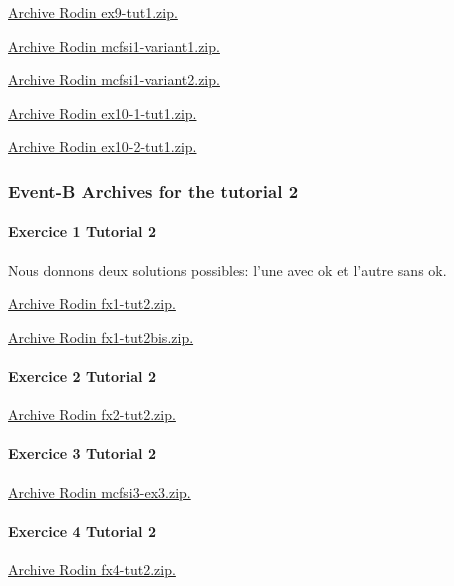 \documentclass[ 12pt]{article}
\begin{document}
\href{http://mery54.github.io/teaching/mosos/models/ex9-tut1.zip}{Archive 
  Rodin   ex9-tut1.zip.}



\href{http://mery54.github.io/teaching/mosos/models/mcfsi1-variant1.zip}{Archive 
  Rodin   mcfsi1-variant1.zip.}

\href{http://mery54.github.io/teaching/mosos/models/mcfsi1-variant2.zip}{Archive 
  Rodin   mcfsi1-variant2.zip.}


\href{http://mery54.github.io/teaching/mosos/models/ex10-1-tut1.zip}{Archive 
  Rodin   ex10-1-tut1.zip.}

\href{http://mery54.github.io/teaching/mosos/models/ex10-2-tut1.zip}{Archive 
  Rodin   ex10-2-tut1.zip.}



 \subsubsection{Event-B Archives for   the tutorial 2}
\label{sec:event-b-archives}

\paragraph{Exercice 1 Tutorial 2}

Nous donnons deux solutions possibles: l'une avec ok et l'autre sans ok.

\href{http://mery54.github.io/teaching/mosos/models/fx1-tut2.zip}{Archive 
  Rodin   fx1-tut2.zip.}


\href{http://mery54.github.io/teaching/mosos/models/fx1-tut2.zip}{Archive 
  Rodin   fx1-tut2bis.zip.}


\paragraph{Exercice 2 Tutorial 2}



\href{http://mery54.github.io/teaching/mosos/models/fx2-tut2.zip}{Archive 
  Rodin   fx2-tut2.zip.}


\paragraph{Exercice 3 Tutorial 2}
\href{http://mery54.github.io/teaching/mosos/models/mcfsi3-ex3.zip}{Archive 
  Rodin  mcfsi3-ex3.zip.}



\paragraph{Exercice 4 Tutorial 2}
\href{http://mery54.github.io/teaching/mosos/models/fx4-tut2.zip}{Archive 
  Rodin   fx4-tut2.zip.}
\end{document}
